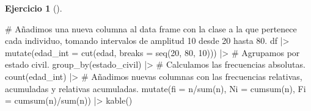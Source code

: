 \documentclass[
  spanish,
  a4paper,
]{scrreport}
\newenvironment{Shaded}{\begin{snugshade}}{\end{snugshade}}
\newcommand{\AttributeTok}[1]{\textcolor[rgb]{0.40,0.45,0.13}{#1}}
\newcommand{\CommentTok}[1]{\textcolor[rgb]{0.37,0.37,0.37}{#1}}
\newcommand{\DecValTok}[1]{\textcolor[rgb]{0.68,0.00,0.00}{#1}}
\newcommand{\FunctionTok}[1]{\textcolor[rgb]{0.28,0.35,0.67}{#1}}
\newcommand{\NormalTok}[1]{\textcolor[rgb]{0.00,0.23,0.31}{#1}}
\newcommand{\SpecialCharTok}[1]{\textcolor[rgb]{0.37,0.37,0.37}{#1}}
\theoremstyle{definition}
\newtheorem{exercise}{Ejercicio}[chapter]
\theoremstyle{remark}
\begin{document}
\begin{exercise}[]
\begin{enumerate}
\begin{tcolorbox}
\begin{Shaded}
\begin{Highlighting}[]
\CommentTok{\# Añadimos una nueva columna al data frame con la clase a la que pertenece cada individuo, tomando intervalos de amplitud 10 desde 20 hasta 80.}
\NormalTok{df }\SpecialCharTok{|\textgreater{}} \FunctionTok{mutate}\NormalTok{(}\AttributeTok{edad\_int =} \FunctionTok{cut}\NormalTok{(edad, }\AttributeTok{breaks =} \FunctionTok{seq}\NormalTok{(}\DecValTok{20}\NormalTok{, }\DecValTok{80}\NormalTok{, }\DecValTok{10}\NormalTok{))) }\SpecialCharTok{|\textgreater{}}
    \CommentTok{\# Agrupamos por estado civil.}
    \FunctionTok{group\_by}\NormalTok{(estado\_civil) }\SpecialCharTok{|\textgreater{}}
    \CommentTok{\# Calculamos las frecuencias absolutas.}
    \FunctionTok{count}\NormalTok{(edad\_int) }\SpecialCharTok{|\textgreater{}} 
    \CommentTok{\# Añadimos nuevas columnas con las frecuencias relativas, acumuladas y relativas acumuladas.}
    \FunctionTok{mutate}\NormalTok{(}\AttributeTok{fi =}\NormalTok{ n}\SpecialCharTok{/}\FunctionTok{sum}\NormalTok{(n), }\AttributeTok{Ni =} \FunctionTok{cumsum}\NormalTok{(n), }\AttributeTok{Fi =} \FunctionTok{cumsum}\NormalTok{(n)}\SpecialCharTok{/}\FunctionTok{sum}\NormalTok{(n)) }\SpecialCharTok{|\textgreater{}}
    \FunctionTok{kable}\NormalTok{()}
\end{Highlighting}
\end{Shaded}


\end{tcolorbox}
\end{enumerate}
\end{exercise}
\end{document}
